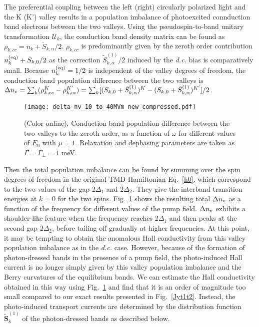 \documentclass[reprint,amsmath,amssymb,aps,prb]{revtex4-1}
\begin{document}
The preferential coupling between the left (right) circularly polarized light and the K (K') valley results in a population imbalance of photoexcited connduction band electrons between the two valleys.
Using the pseudospin-to-band unitary transformation $\mathcal{U}_k$, the conduction band density matrix can be found as $\rho_{k,cc} = n_k+\tilde{S}_{k,\alpha}/2$. $\rho_{k,cc}$ is predominantly given by the zeroth order contribution $n_k^{\rm (eq)}+{S}_{k,0}/2$ as the correction $\tilde{S}_{k,\alpha}^{(1)}/2$ induced by the \textit{d.c.} bias is comparatively small. Because $n_k^{\rm (eq)}=1/2$ is independent of the valley degrees of freedom, the conduction band population difference between the two valleys is $\Delta n_{\rm v}=
\sum_k(\rho_{k,cc}^{K}-\rho_{k,cc}^{K'})  =\sum_k[(S_{k,0}+\tilde{S}_{k,\alpha}^{(1)})^{K}-(S_{k,0}+\tilde{S}_{k,\alpha}^{(1)})^{K'} ]/2$. 
%
\begin{figure}[htb] %
  \texttt{[image: delta\_nv\_10\_to\_40MVm\_new\_compressed.pdf]}
  \caption{(Color online). Conduction band population difference between the two valleys to the zeroth order, as a function of $\omega$ for different values of $E_0$ with  $\mu=1$.
    Relaxation and dephasing parameters are taken as $\Gamma=\Gamma_\perp=1$ meV.}
\label{deltanv}
\end{figure}
%
Then the total population imbalance can be found by summing over the spin degrees of freedom in the original TMD Hamiltonian Eq.~\ref{h0}, which correspond to the two values of the gap $2\Delta_1$ and $2\Delta_2$. They give the interband transition energies at $k = 0$ for the two spins. Fig.~\ref{deltanv} shows the resulting total $\Delta n_{\rm v}$ as a function of the frequency for different values of the pump field. $\Delta n_{\rm v}$ exhibits a shoulder-like feature when the frequency reaches $2\Delta_1$ and then peaks at the second gap $2\Delta_2$, before tailing off gradually at higher frequencies. At this point, it may be tempting to obtain the anomalous Hall conductivity from this valley population imbalance as in the \textit{d.c.} case. However, because of the formation of photon-dressed bands in the presence of a pump field, the photo-induced Hall current is no longer simply given by this valley population imbalance and the Berry curvatures of the equilibrium bands. We can estimate the Hall conductivity obtained in this way \cite{mak2014valley} using Fig.~\ref{deltanv} and find that it is an order of magnitude too small compared to our exact results presented in Fig.~\ref{Jyt1t2}. 
Instead, the photo-induced transport currents are determined by the distribution function $\tilde{\bm{S}}_{k}^{(1)}$ of the photon-dressed bands as described below.
\end{document}
